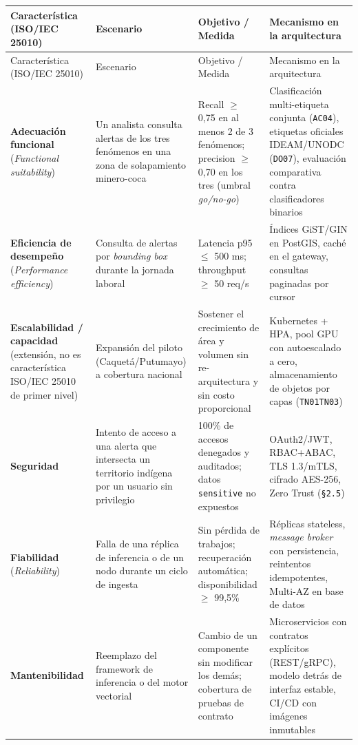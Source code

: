\documentclass{article}
\begin{document}
{\small
\begin{longtable}{@{}L{1.47in}L{1.24in}L{1.47in}L{1.77in}@{}}
\toprule
Característica (ISO/IEC 25010) & Escenario & Objetivo / Medida & Mecanismo en la arquitectura \\
\midrule
\endfirsthead
\toprule
Característica (ISO/IEC 25010) & Escenario & Objetivo / Medida & Mecanismo en la arquitectura \\
\midrule
\endhead
\bottomrule
\endlastfoot
\textbf{Adecuación funcional} (\emph{Functional suitability}) & Un analista consulta alertas de los tres fenómenos en una zona de solapamiento minero-coca & Recall \ensuremath{\geq} 0,75 en al menos 2 de 3 fenómenos; precision \ensuremath{\geq} 0,70 en los tres (umbral \emph{go/no-go}) & Clasificación multi-etiqueta conjunta (\texttt{AC04}), etiquetas oficiales IDEAM/UNODC (\texttt{DO07}), evaluación comparativa contra clasificadores binarios \\
\textbf{Eficiencia de desempeño} (\emph{Performance efficiency}) & Consulta de alertas por \emph{bounding box} durante la jornada laboral & Latencia p95 \ensuremath{\leq} 500 ms; throughput \ensuremath{\geq} 50 req/s & Índices GiST/GIN en PostGIS, caché en el gateway, consultas paginadas por cursor \\
\textbf{Escalabilidad / capacidad} (extensión, no es característica ISO/IEC 25010 de primer nivel) & Expansión del piloto (Caquetá/Putumayo) a cobertura nacional & Sostener el crecimiento de área y volumen sin re-arquitectura y sin costo proporcional & Kubernetes + HPA, pool GPU con autoescalado a cero, almacenamiento de objetos por capas (\texttt{TN01}\textendash{}\texttt{TN03}) \\
\textbf{Seguridad} & Intento de acceso a una alerta que intersecta un territorio indígena por un usuario sin privilegio & 100\% de accesos denegados y auditados; datos \texttt{sensitive} no expuestos & OAuth2/JWT, RBAC+ABAC, TLS 1.3/mTLS, cifrado AES-256, Zero Trust (\texttt{\S{}2.\allowbreak{}5}) \\
\textbf{Fiabilidad} (\emph{Reliability}) & Falla de una réplica de inferencia o de un nodo durante un ciclo de ingesta & Sin pérdida de trabajos; recuperación automática; disponibilidad \ensuremath{\geq} 99,5\% & Réplicas stateless, \emph{message broker} con persistencia, reintentos idempotentes, Multi-AZ en base de datos \\
\textbf{Mantenibilidad} & Reemplazo del framework de inferencia o del motor vectorial & Cambio de un componente sin modificar los demás; cobertura de pruebas de contrato & Microservicios con contratos explícitos (REST/gRPC), modelo detrás de interfaz estable, CI/CD con imágenes inmutables \\

\end{longtable}}
\end{document}
